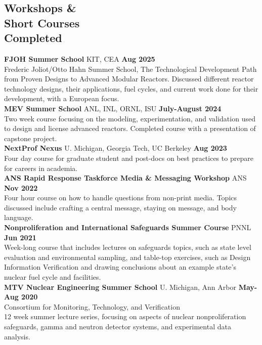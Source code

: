 \documentclass[margin,line]{resume}
\begin{document}
\begin{resume}
    \section{\mysidestyle Workshops \&\\Short Courses\\Completed}
    \textbf{FJOH Summer School} KIT, CEA \hfill \textbf{Aug 2025}\\
    Frederic Joliot/Otto Hahn Summer School, The Technological Development 
    Path from Proven Designs to Advanced Modular Reactors. Discussed 
    different reactor technology designs, their applications, fuel cycles, and 
    current work done for their development, with a European focus. \\
    \textbf{MEV Summer School} ANL, INL, ORNL, ISU \hfill \textbf{July-August 2024}\\
    Two week course focusing on the modeling, experimentation, and 
    validation used to design and license advanced reactors. Completed 
    course with a presentation of capstone project. \\
    \textbf{NextProf Nexus} 
    U. Michigan, Georgia Tech, UC Berkeley \hfill \textbf{Aug 2023}\\
    Four day course for graduate student and post-docs on best practices to prepare for careers in 
    academia. \\
    \textbf{ANS Rapid Response Taskforce Media \& Messaging Workshop} 
    ANS \hfill \textbf{Nov 2022}\\
    Four hour course on how to handle questions from non-print media. Topics discussed 
    include crafting a central message, staying on message, and body language. \\
    \textbf{Nonproliferation and International Safeguards Summer Course} 
    PNNL \hfill \textbf{Jun 2021} \\
    Week-long course that includes lectures on safeguards topics, such as state level evaluation
    and environmental sampling, and table-top exercises, such as Design Information 
    Verification and drawing conclusions about an example state's nuclear  fuel cycle and 
    facilities. \\
    \textbf{MTV Nuclear Engineering Summer School} 
    U. Michigan, Ann Arbor \hfill \textbf{May-Aug 2020} \\
    Consortium for Monitoring, Technology, and Verification\\
    12 week summer lecture series, focusing on aspects of nuclear nonproliferation safeguards, gamma and neutron detector systems, and experimental data analysis. \\

\end{resume}
\end{document}
